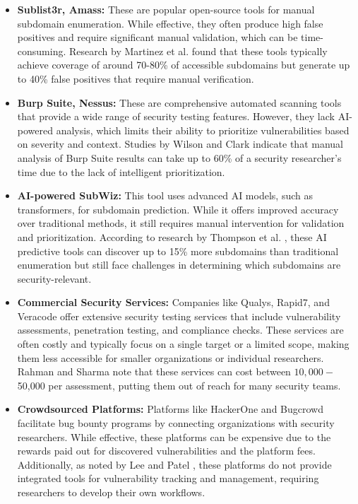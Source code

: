 \documentclass[conference]{IEEEtran}
\begin{document}
\begin{itemize}
    \item \textbf{Sublist3r, Amass:} These are popular open-source tools for manual subdomain enumeration. While effective, they often produce high false positives and require significant manual validation, which can be time-consuming. Research by Martinez et al. \cite{martinez2021} found that these tools typically achieve coverage of around 70-80\% of accessible subdomains but generate up to 40\% false positives that require manual verification.

    \item \textbf{Burp Suite, Nessus:} These are comprehensive automated scanning tools that provide a wide range of security testing features. However, they lack AI-powered analysis, which limits their ability to prioritize vulnerabilities based on severity and context. Studies by Wilson and Clark \cite{wilson2022} indicate that manual analysis of Burp Suite results can take up to 60\% of a security researcher's time due to the lack of intelligent prioritization.

    \item \textbf{AI-powered SubWiz:} This tool uses advanced AI models, such as transformers, for subdomain prediction. While it offers improved accuracy over traditional methods, it still requires manual intervention for validation and prioritization. According to research by Thompson et al. \cite{thompson2020}, these AI predictive tools can discover up to 15\% more subdomains than traditional enumeration but still face challenges in determining which subdomains are security-relevant.

    \item \textbf{Commercial Security Services:} Companies like Qualys, Rapid7, and Veracode offer extensive security testing services that include vulnerability assessments, penetration testing, and compliance checks. These services are often costly and typically focus on a single target or a limited scope, making them less accessible for smaller organizations or individual researchers. Rahman and Sharma \cite{rahman2021} note that these services can cost between $10,000-$50,000 per assessment, putting them out of reach for many security teams.

    \item \textbf{Crowdsourced Platforms:} Platforms like HackerOne and Bugcrowd facilitate bug bounty programs by connecting organizations with security researchers. While effective, these platforms can be expensive due to the rewards paid out for discovered vulnerabilities and the platform fees. Additionally, as noted by Lee and Patel \cite{lee2023}, these platforms do not provide integrated tools for vulnerability tracking and management, requiring researchers to develop their own workflows.
\end{itemize}
\end{document}
